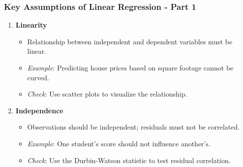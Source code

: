 \documentclass[aspectratio=169]{beamer}
\begin{document}
\begin{frame}[fragile]
    \frametitle{Key Assumptions of Linear Regression - Part 1}
    \begin{enumerate}
        \item \textbf{Linearity}
            \begin{itemize}
                \item Relationship between independent and dependent variables must be linear.
                \item \textit{Example}: Predicting house prices based on square footage cannot be curved.
                \item \textit{Check}: Use scatter plots to visualize the relationship.
            \end{itemize}

        \item \textbf{Independence}
            \begin{itemize}
                \item Observations should be independent; residuals must not be correlated.
                \item \textit{Example}: One student’s score should not influence another's.
                \item \textit{Check}: Use the Durbin-Watson statistic to test residual correlation.
            \end{itemize}
    \end{enumerate}
\end{frame}
\end{document}
